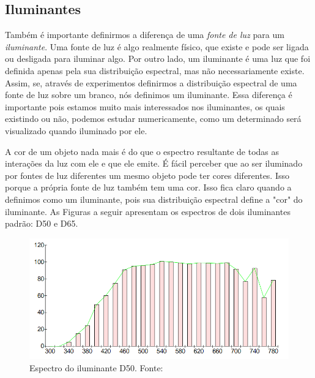 \documentclass[a4paper,10pt]{report}
\begin{document}
\subsection{Iluminantes}
\par
Também é importante definirmos a diferença de uma \textit{fonte de luz} para um
\textit{iluminante}. Uma fonte de luz é algo realmente físico, que existe e
pode ser ligada ou desligada para iluminar algo. Por outro lado, um iluminante é
uma luz que foi definida apenas pela sua distribuição espectral, mas não
necessariamente existe. Assim, se, através de experimentos definirmos a
distribuição espectral de uma fonte de luz sobre um branco, nós definimos um
iluminante. Essa diferença é importante pois estamos muito mais interessados
nos iluminantes, os quais existindo ou não, podemos estudar numericamente, como
um determinado será visualizado quando iluminado por ele.

\par
A cor de um objeto nada mais é do que o espectro resultante de todas as
interações da luz com ele e que ele emite. É fácil perceber que ao ser iluminado
por fontes de luz diferentes um mesmo objeto pode ter cores diferentes. Isso
porque a própria fonte de luz também tem uma cor. Isso fica claro quando a
definimos como um iluminante, pois sua distribuição espectral define a "cor" do
iluminante. As Figuras a seguir apresentam os espectros de dois iluminantes
padrão: D50 e D65.

\begin{figure}[!htb]
     \centering
     \includegraphics[scale=0.8]{img/illuminant_d50.png}
     \caption{Espectro do iluminante D50. Fonte:
}
     \label{fig:illuminant_d50}
\end{figure}
\end{document}

